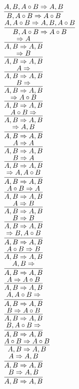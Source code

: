 \documentclass[11pt]{article}
\begin{document}
\begin{center}
\bigskip
\\$\infer{B, A\circ B\Rightarrow A\circ B}{A, B, A\circ B\Rightarrow A, B}$
\bigskip
\\$\infer{B, A\circ B\Rightarrow A\circ B}{A, A\circ B\Rightarrow A, B, A\circ B}$
\bigskip
\\$\infer{A, B\Rightarrow A, B}{\Rightarrow A}$
\bigskip
\\$\infer{A, B\Rightarrow A, B}{\Rightarrow B}$
\bigskip
\\$\infer{A, B\Rightarrow A, B}{A\Rightarrow }$
\bigskip
\\$\infer{A, B\Rightarrow A, B}{B\Rightarrow }$
\bigskip
\\$\infer{A, B\Rightarrow A, B}{\Rightarrow A\circ B}$
\bigskip
\\$\infer{A, B\Rightarrow A, B}{A\circ B\Rightarrow }$
\bigskip
\\$\infer{A, B\Rightarrow A, B}{\Rightarrow A, B}$
\bigskip
\\$\infer{A, B\Rightarrow A, B}{A\Rightarrow A}$
\bigskip
\\$\infer{A, B\Rightarrow A, B}{B\Rightarrow A}$
\bigskip
\\$\infer{A, B\Rightarrow A, B}{\Rightarrow A, A\circ B}$
\bigskip
\\$\infer{A, B\Rightarrow A, B}{A\circ B\Rightarrow A}$
\bigskip
\\$\infer{A, B\Rightarrow A, B}{A\Rightarrow B}$
\bigskip
\\$\infer{A, B\Rightarrow A, B}{B\Rightarrow B}$
\bigskip
\\$\infer{A, B\Rightarrow A, B}{\Rightarrow B, A\circ B}$
\bigskip
\\$\infer{A, B\Rightarrow A, B}{A\circ B\Rightarrow B}$
\bigskip
\\$\infer{A, B\Rightarrow A, B}{A, B\Rightarrow }$
\bigskip
\\$\infer{A, B\Rightarrow A, B}{A\Rightarrow A\circ B}$
\bigskip
\\$\infer{A, B\Rightarrow A, B}{A, A\circ B\Rightarrow }$
\bigskip
\\$\infer{A, B\Rightarrow A, B}{B\Rightarrow A\circ B}$
\bigskip
\\$\infer{A, B\Rightarrow A, B}{B, A\circ B\Rightarrow }$
\bigskip
\\$\infer{A, B\Rightarrow A, B}{A\circ B\Rightarrow A\circ B}$
\bigskip
\\$\infer{A, B\Rightarrow A, B}{A\Rightarrow A, B}$
\bigskip
\\$\infer{A, B\Rightarrow A, B}{B\Rightarrow A, B}$

\end{center}
\end{document}

